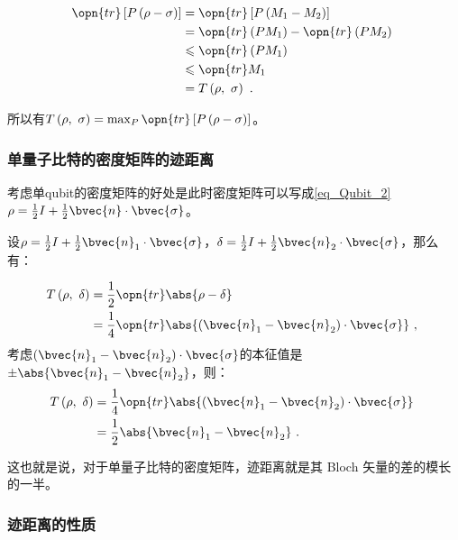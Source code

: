 \begin{equation}
\begin{aligned}
\opn{tr} \left[ P\left(\rho - \sigma\right) \right] &= \opn{tr}\left[ P\left(M_1 - M_2\right) \right] \\
&= \opn{tr}\left(PM_1\right) - \opn{tr}\left(PM_2\right) \\
&\leqslant \opn{tr}\left(PM_1\right) \\
&\leqslant \opn{tr}M_1 \\
&= T\left( \rho,~\sigma \right)~.
\end{aligned}~
\end{equation}

所以有$T\left(\rho,~\sigma\right) = \max_{ P } \opn{tr}\left[P\left(\rho - \sigma\right)\right]$。

\subsubsection{单量子比特的密度矩阵的迹距离}

考虑单qubit的密度矩阵的好处是此时密度矩阵可以写成\autoref{eq_Qubit_2}~$\rho = \frac{1}{2}I + \frac{1}{2}\bvec{n}\cdot \bvec{\sigma}$。

设$\rho = \frac{1}{2}I + \frac{1}{2}\bvec{n}_1\cdot \bvec{\sigma}$，$\delta = \frac{1}{2}I + \frac{1}{2}\bvec{n}_2\cdot \bvec{\sigma}$，那么有：

\begin{equation}
\begin{aligned}
T\left(\rho,~\delta\right) &= \frac{1}{2}\opn{tr}\abs{\rho - \delta} \\
&= \frac{1}{4}\opn{tr}\abs{\left(\bvec{n}_1 - \bvec{n}_2\right) \cdot \bvec{\sigma}}~,
\end{aligned}~
\end{equation}
考虑$\left(\bvec{n}_1 - \bvec{n}_2\right) \cdot \bvec{\sigma}$的本征值是$\pm \abs{\bvec{n}_1 - \bvec{n}_2}$，则：
\begin{equation}
\begin{aligned}
T\left(\rho,~\delta\right) 
&= \frac{1}{4}\opn{tr}\abs{\left(\bvec{n}_1 - \bvec{n}_2\right) \cdot \bvec{\sigma}} \\ 
&= \frac{1}{2}\abs{\bvec{n}_1 - \bvec{n}_2}~.
\end{aligned}~
\end{equation}

这也就是说，对于单量子比特的密度矩阵，迹距离就是其 Bloch 矢量的差的模长的一半。

\subsubsection{迹距离的性质}

